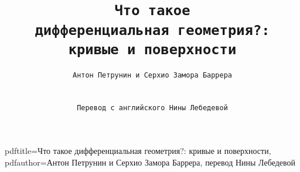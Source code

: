 \hypersetup
{
pdftitle={Что такое дифференциальная геометрия?: кривые и поверхности},
pdfauthor={Антон Петрунин и  Серхио Замора Баррера, перевод Нины Лебедевой}
}

\title{\tt Что такое\\ дифференциальная геометрия?:\\
кривые и поверхности}

\author{\tt Антон Петрунин и \tt  Серхио Замора Баррера\\
\\
\\ \tt Перевод с английского Нины Лебедевой}

\date{}

\maketitle

\thispagestyle{empty}
